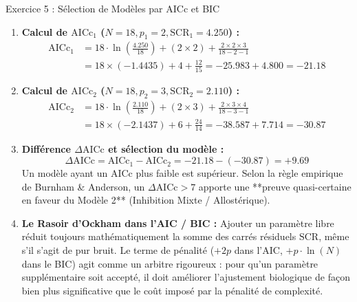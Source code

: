 \documentclass[11pt,a4paper]{article}
\begin{document}
\begin{solutionbox}{Exercice 5 : Sélection de Modèles par AICc et BIC}
\begin{enumerate}[label=\textbf{\alph*.}]
  \item \textbf{Calcul de $\text{AICc}_1$ ($N = 18, p_1 = 2, \text{SCR}_1 = 4.250$) :}
  \begin{align*}
    \text{AICc}_1 &= 18 \cdot \ln\left(\frac{4.250}{18}\right) + (2 \times 2) + \frac{2 \times 2 \times 3}{18 - 2 - 1} \\
    &= 18 \times (-1.4435) + 4 + \frac{12}{15} = -25.983 + 4.800 = \mathbf{-21.18}
  \end{align*}

  \item \textbf{Calcul de $\text{AICc}_2$ ($N = 18, p_2 = 3, \text{SCR}_2 = 2.110$) :}
  \begin{align*}
    \text{AICc}_2 &= 18 \cdot \ln\left(\frac{2.110}{18}\right) + (2 \times 3) + \frac{2 \times 3 \times 4}{18 - 3 - 1} \\
    &= 18 \times (-2.1437) + 6 + \frac{24}{14} = -38.587 + 7.714 = \mathbf{-30.87}
  \end{align*}

  \item \textbf{Différence $\Delta\text{AICc}$ et sélection du modèle :}
  \begin{equation*}
    \Delta\text{AICc} = \text{AICc}_1 - \text{AICc}_2 = -21.18 - (-30.87) = \mathbf{+9.69}
  \end{equation*}
  Un modèle ayant un AICc plus faible est supérieur. Selon la règle empirique de Burnham \& Anderson, un $\Delta\text{AICc} > 7$ apporte une **preuve quasi-certaine en faveur du Modèle 2** (Inhibition Mixte / Allostérique).

  \item \textbf{Le Rasoir d'Ockham dans l'AIC / BIC :}
  Ajouter un paramètre libre réduit toujours mathématiquement la somme des carrés résiduels $\text{SCR}$, même s'il s'agit de pur bruit. Le terme de pénalité ($+2p$ dans l'AIC, $+p \cdot \ln(N)$ dans le BIC) agit comme un arbitre rigoureux : pour qu'un paramètre supplémentaire soit accepté, il doit améliorer l'ajustement biologique de façon bien plus significative que le coût imposé par la pénalité de complexité.
\end{enumerate}
\end{solutionbox}
\end{document}
